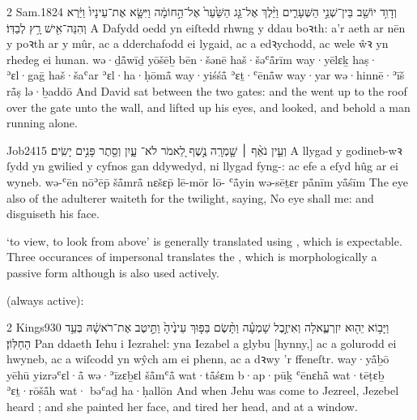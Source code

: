 \begin{example}{2 Sam.}{18}{24}{}{}
	\quoling
	{וְדָוִ֥ד יוֹשֵׁ֖ב בֵּין־שְׁנֵ֣י הַשְּׁעָרִ֑ים וַיֵּ֨לֶךְ  אֶל־גַּ֤ג הַשַּׁ֙עַר֙ אֶל־הַ֣חוֹמָ֔ה וַיִּשָּׂ֤א אֶת־עֵינָיו֙ וַיַּ֔רְא וְהִנֵּה־אִ֖ישׁ רָ֥ץ לְבַדּֽוֹ׃}
	{A Dafydd oedd yn eiſtedd rhwng y ddau boꝛth: a’r  aeth ar nēn y poꝛth ar y mûr, ac a dderchafodd ei lygaid, ac a edꝛychodd, ac wele ŵꝛ yn rhedeg ei hunan.}
	{wə·ḏå̄wīḏ yōšēḇ bēn·šənē haš·šəʿå̄rīm way·yēlɛḵ haṣ· ʾɛl·gaḡ haš·šaʿar ʾɛl·ha·ḥōmå̄ way·yiśśå̄ ʾɛṯ·ʿēnå̄w way·yar wə·hinnē·ʾīš rå̄ṣ lə·ḇaddō}
	{And David sat between the two gates: and the  went up to the roof over the gate unto the wall, and lifted up his eyes, and looked, and behold a man running alone.}
\end{example}



\begin{example}{Job}{24}{15}{}{}
	\quoling
	{וְעֵ֤ין נֹאֵ֨ף ׀ שָׁ֤מְרָֽה נֶ֣שֶׁף לֵ֭אמֹר לֹא־ עָ֑יִן וְסֵ֖תֶר פָּנִ֣ים יָשִֽׂים׃}
	{A llygad y godineb-wꝛ ſydd yn gwilied y cyfnos gan ddywedyd, ni  llygad fyng-: ac efe a eſyd hûg ar ei wyneb.}
	{wə-ʿēn nōʾēp̄ šå̄mrå̄ nɛšɛp̄ lē-mōr lō- ʿå̄yin wə-sēṯɛr på̄nīm yå̄śīm}
	{The eye also of the adulterer waiteth for the twilight, saying, No eye shall  me: and disguiseth his face.}
\end{example}




\begin{paper}
	 ‘to view, to look from above’ is generally translated using , which is expectable. Three occurances of impersonal  translates the , which is morphologically a passive form although is also used actively.
\end{paper}

 (always active):
\begin{example}{2 Kings}{9}{30}{}{}
	\quoling
	{וַיָּב֥וֹא יֵה֖וּא יִזְרְעֶ֑אלָה וְאִיזֶ֣בֶל שָׁמְעָ֗ה וַתָּ֨שֶׂם בַּפּ֤וּךְ עֵינֶ֙יהָ֙ וַתֵּ֣יטֶב אֶת־רֹאשָׁ֔הּ  בְּעַ֥ד הַחַלּֽוֹן׃}
	{Pan ddaeth Iehu i Iezrahel: yna Iezabel a glybu [hynny,] ac a golurodd ei hwyneb, ac a wiſcodd yn wŷch am ei phenn, ac a  dꝛwy ’r ffeneſtr.}
	{way·yå̄ḇō yēhū yizrəʿɛl·å̄ wə·ʾīzɛḇɛl šå̄mʿå̄ wat·tå̄śɛm b·ap·pūḵ ʿēnɛhå̄ wat·tēṭɛḇ ʾɛṯ·rōšå̄h wat· bəʿaḏ ha·ḥallōn}
	{And when Jehu was come to Jezreel, Jezebel heard ; and she painted her face, and tired her head, and  at a window.}
\end{example}

